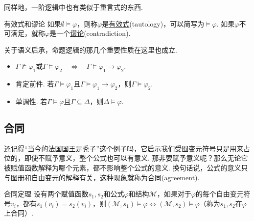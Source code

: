 同样地，一阶逻辑中也有类似于重言式的东西.
\begin{definition}{有效式和谬论}
    如果\(\emptyset \vDash \varphi\)，则称\(\varphi\)是\underline{有效式}(tautology)，可以简写为\(\vDash \varphi\). 如果\(\varphi\)不可满足，就称\(\varphi\)是一个\underline{谬论}(contradiction).
\end{definition}

关于语义后承，命题逻辑的那几个重要性质在这里也成立.
\begin{itemize}
    \item \(\Gamma \not \vDash \varphi_1 \mbox{或} \Gamma \vDash \varphi_2 \quad \Longleftrightarrow \quad \Gamma \vDash \varphi_1 \to \varphi_2\).
    \item 肯定前件. 若\(\Gamma \vDash \varphi_1\)且\(\Gamma \vDash \varphi_1 \to \varphi_2\)，则\(\Gamma \vDash \varphi_2\).
    \item 单调性. 若\(\Gamma \vDash \varphi\)且\(\Gamma \subseteq \Delta\)，则\(\Delta \vDash \varphi\).
\end{itemize}


\subsection{合同}

还记得“当今的法国国王是秃子”这个例子吗，它启示我们受囿变元符号只是用来占位的，即使不赋予意义，整个公式也可以有意义. 那非要赋予意义呢？那么无论它被赋值函数解释为哪个元素，都不影响整个公式的意义. 换句话说，公式的意义只与图册和自由变元的解释有关，这种现象就称为\underline{合同}(agreement).

\begin{theorem}{合同定理}
    设有两个赋值函数\(s_1, s_2\)和公式\(\varphi\)和结构\(\mathcal{M}\)，如果对于\(\varphi\)的每个自由变元符号\(v_i\)，都有\(s_1(v_i)=s_2(v_i)\)，则\((\mathcal{M},s_1) \vDash \varphi \Longleftrightarrow (\mathcal{M},s_2) \vDash \varphi\)（称为\(s_1,s_2\)在\(\varphi\)上合同）.
\end{theorem}

